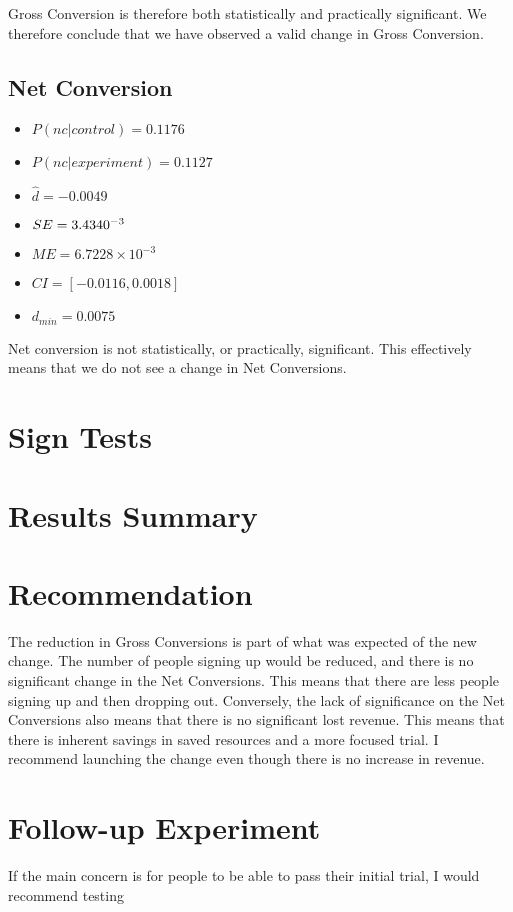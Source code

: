 \documentclass[12pt,a4paper]{article}
\begin{document}
Gross Conversion is therefore both statistically and practically significant. We
therefore conclude that we have observed a valid change in Gross Conversion.

\subsection{Net Conversion}
\begin{itemize}
\item $P(nc|control) = 0.1176$
\item $P(nc|experiment) = 0.1127$
\item $\hat{d} = -0.0049$
\item $SE = 3.4340 \time 10^{-3}$
\item $ME = 6.7228 \times 10^{-3}$
\item $CI = [-0.0116,0.0018]$
\item $d_{min} = 0.0075$
\end{itemize}

Net conversion is not statistically, or practically, significant. This
effectively means that we do not see a change in Net Conversions.

\section{Sign Tests}

\section{Results Summary}

\section{Recommendation}
The reduction in Gross Conversions is part of what was expected of the new
change. The number of people signing up would be reduced, and there is no
significant change in the Net Conversions. This means that there are less people
signing up and then dropping out. Conversely, the lack of significance on the
Net Conversions also means that there is no significant lost revenue. This means
that there is inherent savings in saved resources and a more focused trial. I
recommend launching the change even though there is no increase in revenue.

\section{Follow-up Experiment}
If the main concern is for people to be able to pass their initial trial, I
would recommend testing
\end{document}
